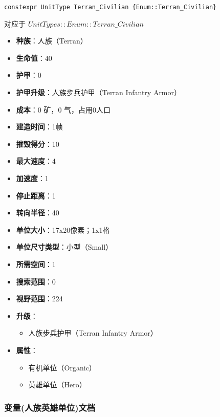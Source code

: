 \begin{tcolorbox}[colback=white, colframe=black!60!white, title=Terran\_Civilian(), arc=0mm]
    \begin{verbatim}
constexpr UnitType Terran_Civilian {Enum::Terran_Civilian}
    \end{verbatim}
    对应于  $ UnitTypes::Enum::Terran\_Civilian $ 
    \begin{itemize}
        \item \textbf{种族}：人族（Terran）
        \item \textbf{生命值}：40
        \item \textbf{护甲}：0
        \item \textbf{护甲升级}：人族步兵护甲（Terran Infantry Armor）
        \item \textbf{成本}：0 矿，0 气，占用0人口
        \item \textbf{建造时间}：1帧
        \item \textbf{摧毁得分}：10
        \item \textbf{最大速度}：4
        \item \textbf{加速度}：1
        \item \textbf{停止距离}：1
        \item \textbf{转向半径}：40
        \item \textbf{单位大小}：17x20像素；1x1格
        \item \textbf{单位尺寸类型}：小型（Small）
        \item \textbf{所需空间}：1
        \item \textbf{搜索范围}：0
        \item \textbf{视野范围}：224
        \item \textbf{升级}：
            \begin{itemize}
                \item 人族步兵护甲（Terran Infantry Armor）
            \end{itemize}
        \item \textbf{属性}：
            \begin{itemize}
                \item 有机单位（Organic）
                \item 英雄单位（Hero）
            \end{itemize}
    \end{itemize}
\end{tcolorbox}

\subsubsection{变量(人族英雄单位)文档}

